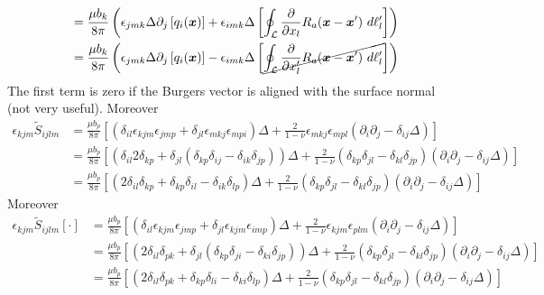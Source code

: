 {\begin{align}
&=\frac{\mu b_k}{8\pi}\left(\epsilon_{jmk}\Delta\partial_j \left[q_i(\bm x)\right]+\epsilon_{imk}\Delta \left[\oint_\mathcal{L} \frac{\partial}{\partial x_l} R_a(\bm x-\bm x')\ d\ell'_l\right]\right)\nonumber\\
&=\frac{\mu b_k}{8\pi}\left(\epsilon_{jmk}\Delta\partial_j \left[q_i(\bm x)\right]-\epsilon_{imk}\Delta \left[\cancel{\oint_\mathcal{L} \frac{\partial}{\partial x'_l} R_a(\bm x-\bm x')\ d\ell'_l}\right]\right)\nonumber
\end{align}
The first term is zero if the Burgers vector is aligned with the surface normal (not very useful).
Moreover
\begin{align}
\epsilon_{kjm}\tilde{S}_{ijlm}
&=\frac{\mu b_p}{8\pi}\left[\left(\delta_{il}\epsilon_{kjm}\epsilon_{jmp}+\delta_{jl}\epsilon_{mkj}\epsilon_{mpi}\right)\Delta+\frac{2}{1-\nu}\epsilon_{mkj}\epsilon_{mpl}\left(\partial_{i}\partial_j-\delta_{ij}\Delta\right)\right]\nonumber\\
&=\frac{\mu b_p}{8\pi}\left[\left(\delta_{il}2\delta_{kp}+\delta_{jl}\left(\delta_{kp}\delta_{ij}-\delta_{ik}\delta_{jp}\right)\right)\Delta+\frac{2}{1-\nu}\left(\delta_{kp}\delta_{jl}-\delta_{kl}\delta_{jp}\right)\left(\partial_{i}\partial_j-\delta_{ij}\Delta\right)\right]\nonumber\\
&=\frac{\mu b_p}{8\pi}\left[\left(2\delta_{il}\delta_{kp}+\delta_{kp}\delta_{il}-\delta_{ik}\delta_{lp}\right)\Delta+\frac{2}{1-\nu}\left(\delta_{kp}\delta_{jl}-\delta_{kl}\delta_{jp}\right)\left(\partial_{i}\partial_j-\delta_{ij}\Delta\right)\right]
\end{align}
}
Moreover
\begin{align}
\epsilon_{kjm}\tilde{S}_{ijlm}[\cdot]
&=\frac{\mu b_p}{8\pi}\left[\left(\delta_{il}\epsilon_{kjm}\epsilon_{jmp}+\delta_{jl}\epsilon_{kjm}\epsilon_{imp}\right)\Delta+\frac{2}{1-\nu}\epsilon_{kjm}\epsilon_{plm}\left(\partial_{i}\partial_j-\delta_{ij}\Delta\right)\right]\nonumber\\
&=\frac{\mu b_p}{8\pi}\left[\left(2\delta_{il}\delta_{pk}+\delta_{jl}(\delta_{kp}\delta_{ji}-\delta_{ki}\delta_{jp})\right)\Delta+\frac{2}{1-\nu}(\delta_{kp}\delta_{jl}-\delta_{kl}\delta_{jp})\left(\partial_{i}\partial_j-\delta_{ij}\Delta\right)\right]\nonumber\\
&=\frac{\mu b_p}{8\pi}\left[\left(2\delta_{il}\delta_{pk}+\delta_{kp}\delta_{li}-\delta_{ki}\delta_{lp}\right)\Delta+\frac{2}{1-\nu}(\delta_{kp}\delta_{jl}-\delta_{kl}\delta_{jp})\left(\partial_{i}\partial_j-\delta_{ij}\Delta\right)\right]\nonumber\\
\end{align}


